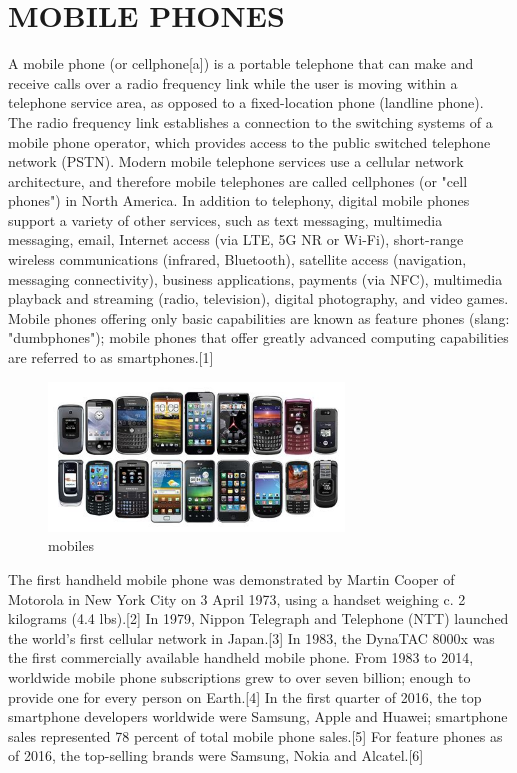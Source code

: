 \documentclass{article}
\begin{document}
	\section{MOBILE PHONES}
	A mobile phone (or cellphone[a]) is a portable telephone that can make and receive calls over a radio frequency link while the user is moving within a telephone service area, as opposed to a fixed-location phone (landline phone). The radio frequency link establishes a connection to the switching systems of a mobile phone operator, which provides access to the public switched telephone network (PSTN). Modern mobile telephone services use a cellular network architecture, and therefore mobile telephones are called cellphones (or "cell phones") in North America. In addition to telephony, digital mobile phones support a variety of other services, such as text messaging, multimedia messaging, email, Internet access (via LTE, 5G NR or Wi-Fi), short-range wireless communications (infrared, Bluetooth), satellite access (navigation, messaging connectivity), business applications, payments (via NFC), multimedia playback and streaming (radio, television), digital photography, and video games. Mobile phones offering only basic capabilities are known as feature phones (slang: "dumbphones"); mobile phones that offer greatly advanced computing capabilities are referred to as smartphones.[1]
	
	
\begin{figure}
	\centering
	\includegraphics[width=0.7\textwidth]{m.jpg}
	\caption{ mobiles}
	\label{fig:mobile phones}
\end{figure}

	The first handheld mobile phone was demonstrated by Martin Cooper of Motorola in New York City on 3 April 1973, using a handset weighing c. 2 kilograms (4.4 lbs).[2] In 1979, Nippon Telegraph and Telephone (NTT) launched the world's first cellular network in Japan.[3] In 1983, the DynaTAC 8000x was the first commercially available handheld mobile phone. From 1983 to 2014, worldwide mobile phone subscriptions grew to over seven billion; enough to provide one for every person on Earth.[4] In the first quarter of 2016, the top smartphone developers worldwide were Samsung, Apple and Huawei; smartphone sales represented 78 percent of total mobile phone sales.[5] For feature phones as of 2016, the top-selling brands were Samsung, Nokia and Alcatel.[6]
\end{document}

